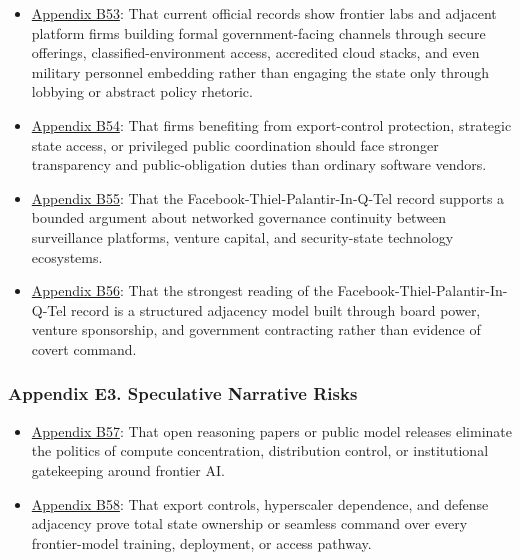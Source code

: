 \documentclass[
  american,
  11pt,
  letterpaper,
]{article}
\providecommand{\tightlist}{%
  \setlength{\itemsep}{0pt}\setlength{\parskip}{0pt}}
\begin{document}
\begin{itemize}
\tightlist
\item
  \hyperref[appendix-b53-current-official-records-show-frontier-labs-and-adjacent-platform-firms-building]{Appendix
  B53}: That current official records show frontier labs and adjacent
  platform firms building formal government-facing channels through
  secure offerings, classified-environment access, accredited cloud
  stacks, and even military personnel embedding rather than engaging the
  state only through lobbying or abstract policy rhetoric.
\item
  \hyperref[appendix-b54-firms-benefiting-from-export-control-protection-strategic-state-access-or-privi]{Appendix
  B54}: That firms benefiting from export-control protection, strategic
  state access, or privileged public coordination should face stronger
  transparency and public-obligation duties than ordinary software
  vendors.
\item
  \hyperref[appendix-b55-the-facebook-thiel-palantir-in-q-tel-record-supports-a-bounded-argument-about-net]{Appendix
  B55}: That the Facebook-Thiel-Palantir-In-Q-Tel record supports a
  bounded argument about networked governance continuity between
  surveillance platforms, venture capital, and security-state technology
  ecosystems.
\item
  \hyperref[appendix-b56-the-strongest-reading-of-the-facebook-thiel-palantir-in-q-tel-record-is-a-structu]{Appendix
  B56}: That the strongest reading of the
  Facebook-Thiel-Palantir-In-Q-Tel record is a structured adjacency
  model built through board power, venture sponsorship, and government
  contracting rather than evidence of covert command.
\end{itemize}

\subsubsection{Appendix E3. Speculative Narrative
Risks}\label{appendix-e3-speculative-narrative-risks}

\begin{itemize}
\tightlist
\item
  \hyperref[appendix-b57-open-reasoning-papers-or-public-model-releases-eliminate-the-politics-of-compute]{Appendix
  B57}: That open reasoning papers or public model releases eliminate
  the politics of compute concentration, distribution control, or
  institutional gatekeeping around frontier AI.
\item
  \hyperref[appendix-b58-export-controls-hyperscaler-dependence-and-defense-adjacency-prove-total-state]{Appendix
  B58}: That export controls, hyperscaler dependence, and defense
  adjacency prove total state ownership or seamless command over every
  frontier-model training, deployment, or access pathway.
\end{itemize}
\end{document}
